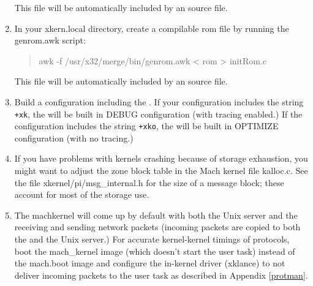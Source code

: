 \begin{enumerate}
This file will be automatically included by an \xk{} source file.


\item 
In your xkern.local directory, create a compilable rom file by running
the genrom.awk script:

\begin{quote}
\begin{tt}
   	awk -f /usr/x32/merge/bin/genrom.awk < rom > initRom.c
\end{tt}
\end{quote}

This file will be automatically included by an \xk{} source file.


\item Build a configuration including the \xk{}.  If your
configuration includes the string {\tt +xk}, the \xk{} will be built
in DEBUG configuration (with tracing enabled.)  If the configuration
includes the string {\tt +xko}, the \xk{} will be built in OPTIMIZE
configuration (with no tracing.)  


\item If you have problems with kernels crashing because of storage exhaustion,
   you might want to adjust the zone block table in the Mach kernel file
   kalloc.c.  See the \xk{} file xkernel/pi/msg\_internal.h for the
   size of a message block; these account for most of the \xk{} storage use.


\item The machkernel will come up by default with both the Unix server
and the \xk{} receiving and sending network packets (incoming
packets are copied to both the \xk{} and the Unix server.)  For
accurate kernel-kernel timings of \xk{} protocols, boot the
mach\_kernel image (which doesn't start the user task) instead of the
mach.boot image and configure the in-kernel driver (xklance) to not
deliver incoming packets to the user task as described in Appendix
\ref{protman}. 


\end{enumerate}

